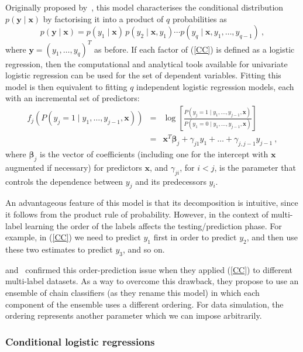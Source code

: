\documentclass[review]{elsarticle}
\begin{document}
	Originally proposed by~\citet{CHAIN}, this model characterises the conditional distribution $p(\mathbf{y}\mid\mathbf{x})$ by factorising it into a product of $q$ probabilities as
	\begin{equation} \label{CC}
	p(\mathbf{y}\mid\mathbf{x}) = p(y_{1}\mid\mathbf{x})\, p(y_{2}\mid\mathbf{x}, y_{1}) \cdots p(y_{q}\mid\mathbf{x}, y_{1},\ldots, y_{q-1})\ ,
	\end{equation}
	where $\mathbf{y}=\left(y_{1},\ldots,y_{q} \right)^T$ as before.
	If each factor of (\ref{CC}) is defined as a logistic regression, then the computational and analytical tools available for univariate logistic regression can be used for the set of dependent variables. Fitting this model is then equivalent to fitting $q$ independent logistic regression models, each with an incremental set of predictors:
	\begin{eqnarray}
	f_{j} \left( P(y_{j} = 1 \mid y_{1},\ldots,y_{j-1},\mathbf{x}) \right) &=& \log \left[ \frac{P(y_{j} = 1\mid y_{1},\ldots,y_{j-1},\mathbf{x})}{P(y_{1} = 0\mid y_{1},\ldots,y_{j-1},\mathbf{x})} \right] \nonumber\\
	&=& \mathbf{x}^T \bm{\beta}_j + \gamma_{j1} y_{1} + \ldots + \gamma_{j,j-1} y_{j-1}\ ,
	\label{eq:cc}
	\end{eqnarray}
	where $\bm{\beta}_{j}$ is the vector of coefficients (including one for the intercept with $\mathbf{x}$ augmented if necessary) for predictors $\mathbf{x}$, and $\gamma_{ji}$, for $i<j$, is the parameter that controls the dependence between $y_{j}$ and its predecessors $y_{i}$. 
	
	An advantageous feature of this model is that its decomposition is intuitive, since it follows from the product rule of probability. However, in the context of multi-label learning the order of the labels affects the testing/prediction phase. For example, in (\ref{CC}) we need to predict $y_{1}$ first in order to predict $y_{2}$, and then use these two estimates to predict $y_{3}$, and so on.
	
	\citet{OCC} and~\citet{PCC} confirmed this order-prediction issue when they applied (\ref{CC}) to different multi-label datasets. As a way to overcome this drawback, they propose to use an ensemble of chain classifiers (as they rename this model) in which each component of the ensemble uses a different ordering. For data simulation, the ordering represents another parameter which we can impose arbitrarily.
	
	\subsubsection{Conditional logistic regressions}
	
\end{document}
